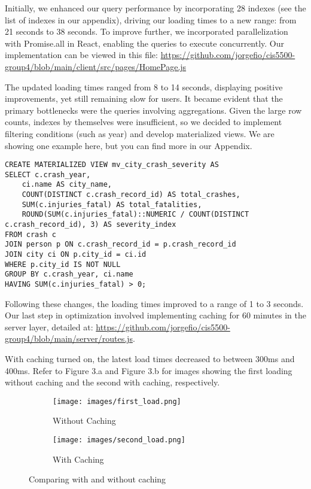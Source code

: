 \documentclass[12pt]{article}
\begin{document}
Initially, we enhanced our query performance by incorporating 28 indexes (see the list of indexes in our appendix), driving our loading times to a new range: from 21 seconds to 38 seconds. To improve further, we incorporated parallelization with Promise.all in React, enabling the queries to execute concurrently. Our implementation can be viewed in this file: \url{https://github.com/jorgefio/cis5500-group4/blob/main/client/src/pages/HomePage.js}

The updated loading times ranged from 8 to 14 seconds, displaying positive improvements, yet still remaining slow for users. It became evident that the primary bottlenecks were the queries involving aggregations. Given the large row counts, indexes by themselves were insufficient, so we decided to implement filtering conditions (such as year) and develop materialized views. We are showing one example here, but you can find more in our Appendix.
{\scriptsize
\begin{verbatim}
CREATE MATERIALIZED VIEW mv_city_crash_severity AS
SELECT c.crash_year,
    ci.name AS city_name,
    COUNT(DISTINCT c.crash_record_id) AS total_crashes,
    SUM(c.injuries_fatal) AS total_fatalities,
    ROUND(SUM(c.injuries_fatal)::NUMERIC / COUNT(DISTINCT c.crash_record_id), 3) AS severity_index
FROM crash c
JOIN person p ON c.crash_record_id = p.crash_record_id
JOIN city ci ON p.city_id = ci.id
WHERE p.city_id IS NOT NULL
GROUP BY c.crash_year, ci.name
HAVING SUM(c.injuries_fatal) > 0;
\end{verbatim}}


Following these changes, the loading times improved to a range of 1 to 3 seconds. Our last step in optimization involved implementing caching for 60 minutes in the server layer, detailed at: \url{https://github.com/jorgefio/cis5500-group4/blob/main/server/routes.js}. 

With caching turned on, the latest load times decreased to between 300ms and 400ms. Refer to Figure 3.a and Figure 3.b for images showing the first loading without caching and the second with caching, respectively.

\begin{figure}[htbp]
  \centering
  \begin{subfigure}[b]{0.45\textwidth}
    \texttt{[image: images/first\_load.png]}
    \caption{Without Caching}
    \label{fig:fig1}
  \end{subfigure}
  \hfill
  \begin{subfigure}[b]{0.45\textwidth}
    \texttt{[image: images/second\_load.png]}
    \caption{With Caching}
    \label{fig:fig2}
  \end{subfigure}
  \caption{Comparing with and without caching}
  \label{fig:sidebyside}
\end{figure}
\end{document}
